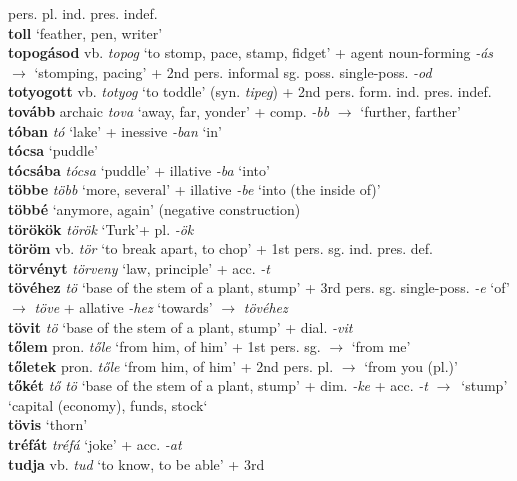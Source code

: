 \documentclass[11pt]{article}
\begin{document}
pers. pl. ind. pres. indef. \\
\textbf{toll} `feather, pen, writer' \\
\textbf{topogásod} vb. \emph{topog} `to stomp, pace, stamp, fidget' +
agent noun\hyp{}forming \emph{-ás} $\rightarrow$ `stomping, pacing' + 2nd
pers. informal sg. poss. single\hyp{}poss. \emph{-od} \\
\textbf{totyogott} vb. \emph{totyog} `to toddle' (syn. \emph{tipeg}) +
2nd pers. form. ind. pres. indef. \\
\textbf{tovább} archaic \emph{tova} `away, far, yonder' +
comp. \emph{-bb} $\rightarrow$ `further, farther' \\
\textbf{tóban} \emph{tó} `lake' + inessive \emph{-ban} `in' \\
\textbf{tócsa} `puddle' \\
\textbf{tócsába} \emph{tócsa} `puddle' + illative \emph{-ba} `into' \\
\textbf{többe} \emph{több} `more, several' + illative \emph{-be}
`into (the inside of)' \\
\textbf{többé} `anymore, again' (negative construction) \\
\textbf{törökök} \emph{török} `Turk'+ pl. \emph{-ök} \\
\textbf{töröm} vb. \emph{tör} `to break apart, to chop' + 1st
pers. sg. ind. pres. def. \\
\textbf{törvényt} \emph{törveny} `law, principle' + acc. \emph{-t} \\
\textbf{tövéhez} \emph{tö} `base of the stem of a plant, stump' + 3rd
pers. sg. single\hyp{}poss. \emph{-e} `of' $\rightarrow$ \emph{töve} +
allative \emph{-hez} `towards' $\rightarrow$ \emph{tövéhez} \\
\textbf{tövit} \emph{tö} `base of the stem of a plant, stump' + dial. \emph{-vit} \\
\textbf{tőlem} pron. \emph{tőle} `from him, of him' + 1st pers. sg. $\rightarrow$
  `from me' \\
\textbf{tőletek} pron. \emph{tőle} `from him, of him' + 2nd
pers. pl. $\rightarrow$ `from you (pl.)' \\
\textbf{tőkét} \emph{tő} \emph{tö} `base of the stem of a plant, stump'
+ dim. \emph{-ke} + acc. \emph{-t} $\rightarrow$\
`stump' \textbar\textbar{} `capital (economy), funds, stock` \\
\textbf{tövis} `thorn' \\
\textbf{tréfát} \emph{tréfá} `joke' + acc. \emph{-at} \\
\textbf{tudja} vb. \emph{tud} `to know, to be able' + 3rd
\end{document}
